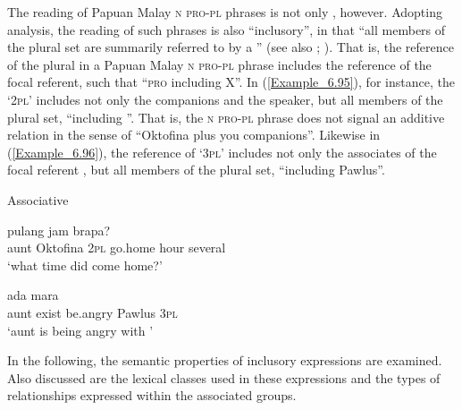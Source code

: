 The reading of Papuan Malay \textsc{n} \textsc{pro-pl}  phrases is not only , however. Adopting  analysis, the reading of such  phrases is also “inclusory”, in that “all members of the plural set are summarily referred to by a ” (see also \citealt[25]{Haspelmath.2004}; \citealt{Gil.2009}). That is, the reference of the plural  in a Papuan Malay \textsc{n} \textsc{pro-pl}  phrase includes the reference of the focal referent, such that ``\textsc{pro} including X''. In (\ref{Example_6.95}), for instance, the   ‘\textsc{2pl}’ includes not only the companions and the speaker, but all members of the plural set, “including ”. That is, the \textsc{n} \textsc{pro-pl}  phrase  does not signal an additive relation in the sense of ``Oktofina  plus you companions''. Likewise in (\ref{Example_6.96}), the reference of  ‘\textsc{3pl}’ includes not only the associates of the focal referent , but all members of the plural set, ``including Pawlus''.


\begin{styleExampleTitle}
Associative 
\end{styleExampleTitle}

\ea
\label{Example_6.95}
 {} {} {pulang} {jam} {brapa?}\\ %
 aunt  Oktofina  \textsc{2pl}  go.home  hour  several\\

\glt
‘what time did  come home?’ \textstyleExampleSource{[081006-010-Cv.0001]}
\z

\ea
\label{Example_6.96}
 {ada} {mara} {} {}\\ %
 aunt  exist  be.angry  Pawlus  \textsc{3pl}\\

\glt
‘aunt is being angry with ’ \textstyleExampleSource{[081006-009-Cv.0002]}
\z



In the following, the semantic properties of  inclusory expressions are examined. Also discussed are the lexical classes used in these expressions and the types of relationships expressed within the associated groups.



